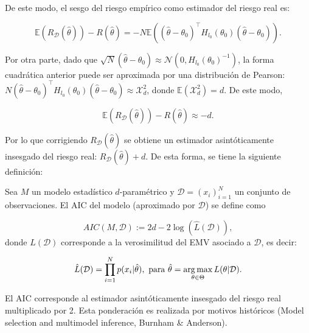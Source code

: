 De este modo, el sesgo del riesgo empírico como estimador del riesgo real es:

\begin{equation*}
	\mathbb{E}(R_\mathcal{D}(\hat{\theta})) - R(\hat{\theta}) = -N \mathbb{E}\left((\hat{\theta}-\theta_0)^\top H_{l_0}(\theta_0) (\hat{\theta}-\theta_0)\right).
\end{equation*}

Por otra parte, dado que $\sqrt{N}\left(\hat{\theta}-\theta_0\right)\approx\mathcal{N}\left(0,H_{l_0}(\theta_0)^{-1}\right)$, la forma cuadrática anterior puede ser aproximada por una distribución de Pearson: $N(\hat{\theta}-\theta_0)^\top H_{l_0}(\theta_0) (\hat{\theta}-\theta_0)\approx\mathcal{X}^2_d$, donde $\mathbb{E}(\mathcal{X}^2_d)=d$. De este modo,

\begin{equation}
	\mathbb{E}(R_\mathcal{D}(\hat{\theta})) - R(\hat{\theta}) \approx -d.
\end{equation}

Por lo que corrigiendo $R_\mathcal{D}(\hat{\theta})$ se obtiene un estimador asintóticamente insesgado del riesgo real: $R_\mathcal{D}(\hat{\theta})+d$. De esta forma, se tiene la siguiente definición:

\begin{definition}[AIC]
	Sea $M$ un modelo estadístico $d$-paramétrico y $\mathcal{D}=(x_i)_{i=1}^N$ un conjunto de observaciones. El AIC del modelo (aproximado por $\mathcal{D}$) se define como
	
	\begin{equation}
		AIC(M,\mathcal{D}):=2d-2\log\left(\hat{L}(\mathcal{D})\right),
	\end{equation}
donde $\hat{L}(\mathcal{D})$ corresponde a la verosimilitud del EMV asociado a $\mathcal{D}$, es decir:
	
	\begin{equation}
		\hat{L}(\mathcal{D}) = \prod_{i=1}^N p(x_i|\hat{\theta}),\text{ para } \hat{\theta} = \operatorname*{arg\,max}_{\theta\in\Theta} L(\theta|\mathcal{D}).
	\end{equation}
\end{definition}

\begin{remark}
El AIC corresponde al estimador asintóticamente insesgado del riesgo real multiplicado por 2. Esta ponderación es realizada por motivos históricos (Model selection and multimodel inference, Burnham \& Anderson).
\end{remark}

